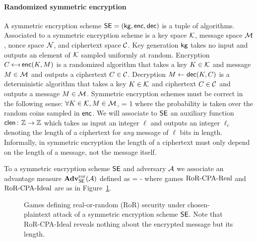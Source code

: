 \paragraph{Randomized symmetric encryption} A symmetric encryption scheme ${\mathsf{SE}} = ({\sf kg}, {\sf enc}, {\sf dec})$ 
is a tuple of algorithms. Associated to a symmetric encryption scheme is a key space ${\cal K}$, message space ${\cal M}$, nonce space ${\cal N}$, and ciphertext space ${\cal C}$.
Key generation ${\sf kg}$ takes no input and outputs an element of ${\cal K}$ sampled uniformly at random. Encryption $C\getsr\enc(K, M)$ is a randomized algorithm that takes a key $K\in{\cal K}$ and message $M\in{\cal M}$ and outputs a ciphertext $C\in{\cal C}$. Decryption $M\gets{\sf dec}(K, C)$ is a deterministic algorithm that takes a key $K\in{\cal K}$ and ciphertext $C\in{\cal C}$ and outputs a message $M\in{\cal M}$. Symmetric encryption schemes must be correct in the following sense: $\forall K\in{\cal K},M\in{\cal M}$,
\bnm
{} = 1
\enm
where the probability is taken over the random coins sampled in ${\sf enc}$. We will associate to ${\mathsf{SE}}$ an auxiliary function $\textsf{clen}{{\kern .05em}\colon{\kern .05em}}\mathbb{Z}\rightarrow\mathbb{Z}$ which takes as input an integer $\ell$ and outputs an integer $\ell_c$ denoting the length of a ciphertext for \emph{any} message of $\ell$ bits in length. Informally, in symmetric encryption the length of a ciphertext must only depend on the length of a message, not the message itself. 


To a symmetric encryption scheme ${\mathsf{SE}}$ and adversary ${\mathcal A}$ we associate an advantage measure $\mathbf{Adv}^{\mathrm{ror}}_{{\mathsf{SE}}}({\mathcal A})$ defined as 
\bnm
\AdvROR{\SE}{\advA} = \left\lvert {} - \right\rvert
\enm
where games $\text{RoR-CPA-Real}$ and $\text{RoR-CPA-Ideal}$ are as in Figure~\ref{fig:rorcpa}.

\begin{figure}[t]
\centering
{}
    \caption{Games defining real-or-random (RoR) security under chosen-plaintext attack of a symmetric encryption scheme ${\mathsf{SE}}$. Note that RoR-CPA-Ideal reveals nothing about the encrypted message but its length.}
\label{fig:rorcpa}
\end{figure}

